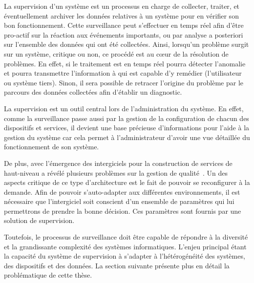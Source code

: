 La supervision d'un système est un processus en charge de collecter, traiter, et éventuellement archiver les données relatives à un système pour en vérifier son bon fonctionnement. Cette surveillance peut s'effectuer en temps réel afin d'être pro-actif sur la réaction aux événements importants, ou par analyse a posteriori sur l'ensemble des données qui ont été collectées. Ainsi, lorsqu'un problème surgit sur un système, critique ou non, ce procédé est au cœur de la résolution de problèmes. En effet, si le traitement est en temps réel pourra détecter l'anomalie et pourra transmettre l'information à qui est capable d'y remédier (l'utilisateur ou système tiers). Sinon, il sera possible de retracer l'origine du problème par le parcours des données collectées afin d'établir un diagnostic.

La supervision est un outil central lors de l'administration du système. En effet, comme la surveillance passe aussi par la gestion de la configuration de chacun des dispositifs et services, il devient une base précieuse d'informations pour l'aide à la gestion du système car cela permet à l'administrateur d'avoir une vue détaillée du fonctionnement de son système.

De plus, avec l'émergence des intergiciels pour la construction de services de haut-niveau a révélé plusieurs problèmes sur la gestion de qualité~\cite{Geihs:challenges}. Un des aspects critique de ce type d'architecture est le fait de pouvoir se reconfigurer à la demande. Afin de pouvoir s'auto-adapter aux différentes environnements, il est nécessaire que l'intergiciel soit conscient d'un ensemble de paramètres qui lui permettrons de prendre la bonne décision. Ces paramètres sont fournis par une solution de supervision.

Toutefois, le processus de surveillance doit être capable de répondre à la diversité et la grandissante complexité des systèmes informatiques. L'enjeu principal étant la capacité du système de supervision à s'adapter à l'hétérogénéité des systèmes, des dispositifs et des données. La section suivante présente plus en détail la problématique de cette thèse.